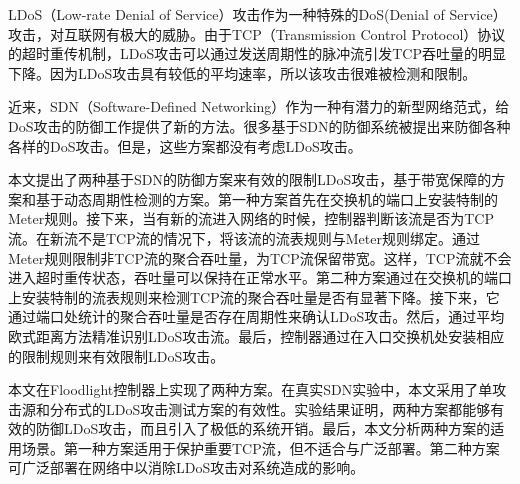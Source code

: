 \begin{cabstract}
  LDoS（Low-rate Denial of Service）攻击作为一种特殊的DoS(Denial of Service）攻击，对互联网有极大的威胁。由于TCP（Transmission Control Protocol）协议的超时重传机制，LDoS攻击可以通过发送周期性的脉冲流引发TCP吞吐量的明显下降。因为LDoS攻击具有较低的平均速率，所以该攻击很难被检测和限制。

  近来，SDN（Software-Defined Networking）作为一种有潜力的新型网络范式，给DoS攻击的防御工作提供了新的方法。很多基于SDN的防御系统被提出来防御各种各样的DoS攻击。但是，这些方案都没有考虑LDoS攻击。

  本文提出了两种基于SDN的防御方案来有效的限制LDoS攻击，基于带宽保障的方案和基于动态周期性检测的方案。第一种方案首先在交换机的端口上安装特制的Meter规则。接下来，当有新的流进入网络的时候，控制器判断该流是否为TCP流。在新流不是TCP流的情况下，将该流的流表规则与Meter规则绑定。通过Meter规则限制非TCP流的聚合吞吐量，为TCP流保留带宽。这样，TCP流就不会进入超时重传状态，吞吐量可以保持在正常水平。第二种方案通过在交换机的端口上安装特制的流表规则来检测TCP流的聚合吞吐量是否有显著下降。接下来，它通过端口处统计的聚合吞吐量是否存在周期性来确认LDoS攻击。然后，通过平均欧式距离方法精准识别LDoS攻击流。最后，控制器通过在入口交换机处安装相应的限制规则来有效限制LDoS攻击。

  本文在Floodlight控制器上实现了两种方案。在真实SDN实验中，本文采用了单攻击源和分布式的LDoS攻击测试方案的有效性。实验结果证明，两种方案都能够有效的防御LDoS攻击，而且引入了极低的系统开销。最后，本文分析两种方案的适用场景。第一种方案适用于保护重要TCP流，但不适合与广泛部署。第二种方案可广泛部署在网络中以消除LDoS攻击对系统造成的影响。

\end{cabstract}



